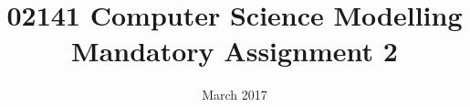 

\title{02141 Computer Science Modelling\\Mandatory Assignment 2}
\date{March 2017}
\author{ }


\maketitle

\setcounter{tocdepth}{1}
\tableofcontents














